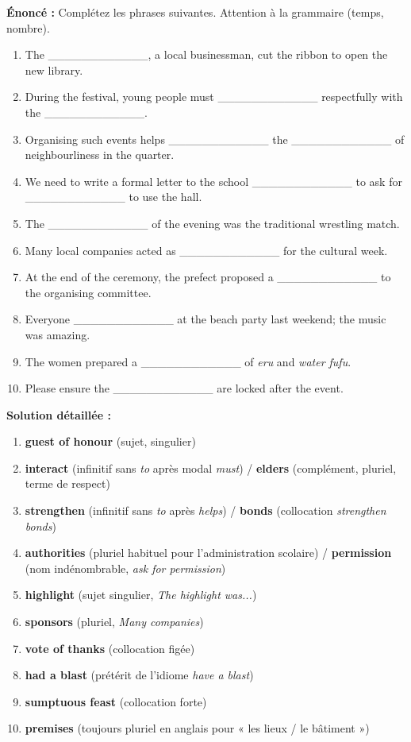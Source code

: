 \documentclass[11pt]{article}
\begin{document}
\begin{exoresolu}
\textbf{Énoncé :} Complétez les phrases suivantes. Attention à la grammaire (temps, nombre).
\begin{enumerate}
\item The \_\_\_\_\_\_\_\_\_\_\_\_, a local businessman, cut the ribbon to open the new library.
\item During the festival, young people must \_\_\_\_\_\_\_\_\_\_\_\_ respectfully with the \_\_\_\_\_\_\_\_\_\_\_\_.
\item Organising such events helps \_\_\_\_\_\_\_\_\_\_\_\_ the \_\_\_\_\_\_\_\_\_\_\_\_ of neighbourliness in the quarter.
\item We need to write a formal letter to the school \_\_\_\_\_\_\_\_\_\_\_\_ to ask for \_\_\_\_\_\_\_\_\_\_\_\_ to use the hall.
\item The \_\_\_\_\_\_\_\_\_\_\_\_ of the evening was the traditional wrestling match.
\item Many local companies acted as \_\_\_\_\_\_\_\_\_\_\_\_ for the cultural week.
\item At the end of the ceremony, the prefect proposed a \_\_\_\_\_\_\_\_\_\_\_\_ to the organising committee.
\item Everyone \_\_\_\_\_\_\_\_\_\_\_\_ at the beach party last weekend; the music was amazing.
\item The women prepared a \_\_\_\_\_\_\_\_\_\_\_\_ of \textit{eru} and \textit{water fufu}.
\item Please ensure the \_\_\_\_\_\_\_\_\_\_\_\_ are locked after the event.
\end{enumerate}
\tcblower
\textbf{Solution détaillée :}
\begin{enumerate}
\item \textbf{guest of honour} (sujet, singulier)
\item \textbf{interact} (infinitif sans \textit{to} après modal \textit{must}) / \textbf{elders} (complément, pluriel, terme de respect)
\item \textbf{strengthen} (infinitif sans \textit{to} après \textit{helps}) / \textbf{bonds} (collocation \textit{strengthen bonds})
\item \textbf{authorities} (pluriel habituel pour l'administration scolaire) / \textbf{permission} (nom indénombrable, \textit{ask for permission})
\item \textbf{highlight} (sujet singulier, \textit{The highlight was...})
\item \textbf{sponsors} (pluriel, \textit{Many companies})
\item \textbf{vote of thanks} (collocation figée)
\item \textbf{had a blast} (prétérit de l'idiome \textit{have a blast})
\item \textbf{sumptuous feast} (collocation forte)
\item \textbf{premises} (toujours pluriel en anglais pour « les lieux / le bâtiment »)
\end{enumerate}
\end{exoresolu}
\end{document}
